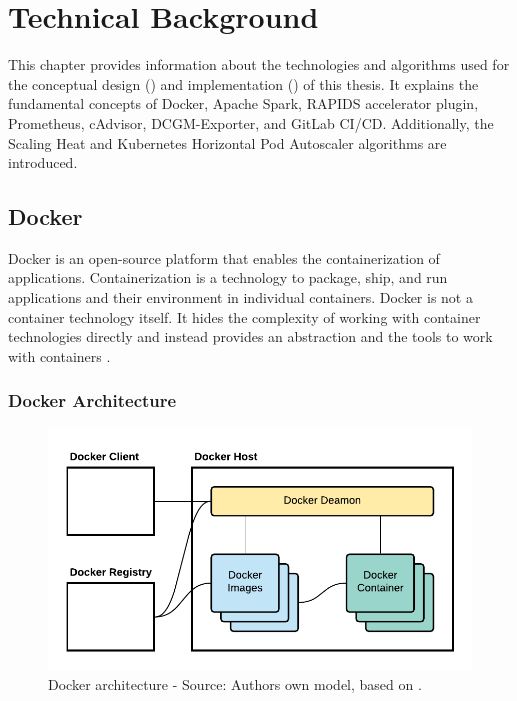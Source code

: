 \chapter{Technical Background}
\label{chap:04_background}

This chapter provides information about the technologies and algorithms used for the conceptual design () and implementation () of this thesis. It explains the fundamental concepts of Docker, Apache Spark, RAPIDS accelerator plugin, Prometheus, cAdvisor, DCGM-Exporter, and GitLab CI/CD. Additionally, the Scaling Heat and Kubernetes Horizontal Pod Autoscaler algorithms are introduced.

\section{Docker}
\label{sec:04_docker}
Docker is an open-source platform that enables the containerization of applications. Containerization is a technology to package, ship, and run applications and their environment in individual containers.
Docker is not a container technology itself. It hides the complexity of working with container technologies directly and instead provides an abstraction and the tools to work with containers \cite{Nickoloff2019Docker, Bullington2020Docker, Potdar2020Docker}.


\subsection{Docker Architecture}
\label{subsec:04_docker_architecture}
\begin{figure}[h]
\centering
\includegraphics[scale=1]{images/04_technical_background/docker/docker_architecture}
\caption{Docker architecture - Source: Authors own model, based on \cite{Docker2020Docs}.}
\label{fig:04_docker_architecture_architecture}
\end{figure}

